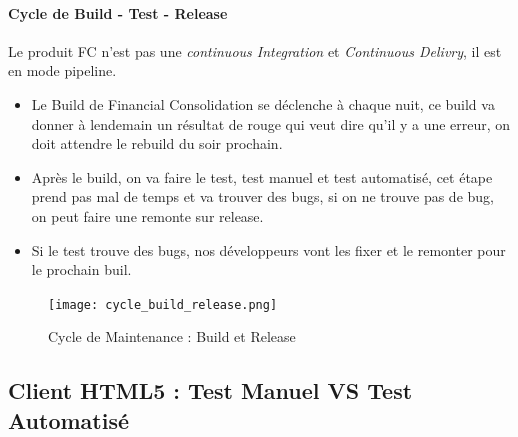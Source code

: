     \paragraph{Cycle de Build - Test - Release}
    \par Le produit FC n'est pas une \textit{continuous  Integration} et \textit{Continuous Delivry}, il est en mode pipeline.
    \begin{itemize}
        \item Le Build de Financial Consolidation se déclenche à chaque nuit, ce build va donner à lendemain un résultat de rouge qui veut dire qu'il y a une erreur, on doit attendre le rebuild du soir prochain.
        \item Après le build, on va faire le test, test manuel et test automatisé, cet étape prend pas mal de temps et va trouver des bugs, si on ne trouve pas de bug, on peut faire une remonte sur release.
        \item Si le test trouve des bugs, nos développeurs vont les fixer et le remonter pour le prochain buil.
    \end{itemize}
    \begin{figure}[H]
        \centering
        \texttt{[image: cycle\_build\_release.png]}
        \caption{Cycle de Maintenance : Build et Release}
        \label{fig:cycle_maintenance_release_build}
    \end{figure}
    
    
\subsection{Client HTML5 : Test Manuel VS Test Automatisé}
